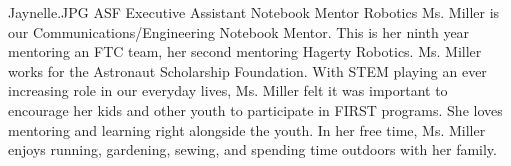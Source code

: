 {Jaynelle.JPG} 
{ASF Executive Assistant} 
{Notebook Mentor} 
{Robotics}
{
Ms. Miller is our Communications/Engineering Notebook Mentor. This is her ninth year mentoring an FTC team, her second mentoring Hagerty Robotics. Ms. Miller works for the Astronaut Scholarship Foundation. With STEM playing an ever increasing role in our everyday lives, Ms. Miller felt it was important to encourage her kids and other youth to participate in FIRST programs. She loves mentoring and learning right alongside the youth. In her free time, Ms. Miller enjoys running, gardening, sewing, and spending time outdoors with her family.
}
